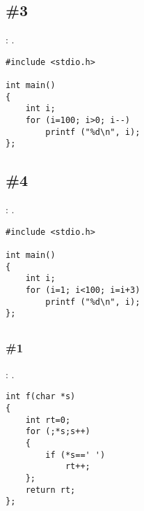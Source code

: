 \subsection{\Exercise \#3}
\label{exercise_solutions_loops_3}

\Exercise: .

\begin{lstlisting}
#include <stdio.h>

int main()
{
	int i;
	for (i=100; i>0; i--)
		printf ("%d\n", i);
};
\end{lstlisting}

\subsection{\Exercise \#4}
\label{exercise_solutions_loops_4}

\Exercise: .

\begin{lstlisting}
#include <stdio.h>

int main()
{
	int i;
	for (i=1; i<100; i=i+3)
		printf ("%d\n", i);
};
\end{lstlisting}

\subsection{}

\subsubsection{\Exercise \#1}
\label{exercise_solutions_strlen_1}

\Exercise: .


\begin{lstlisting}
int f(char *s)
{
	int rt=0;
	for (;*s;s++)
	{
		if (*s==' ')
			rt++;
	};
	return rt;
};
\end{lstlisting}

\subsection{}


